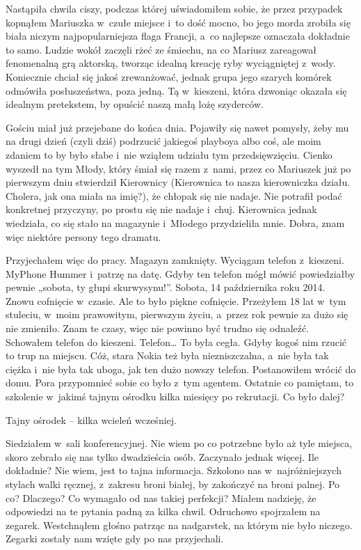 Nastąpiła chwila ciszy, podczas której uświadomiłem sobie, że przez przypadek kopnąłem Mariuszka w~czułe miejsce i~to dość mocno, bo jego morda zrobiła się biała niczym najpopularniejsza flaga Francji, a~co najlepsze oznaczała dokładnie to samo. Ludzie wokół zaczęli rżeć ze śmiechu, na co Mariusz zareagował fenomenalną grą aktorską, tworząc idealną kreację ryby wyciągniętej z~wody. Koniecznie chciał się jakoś zrewanżować, jednak grupa jego szarych komórek odmówiła posłuszeństwa, poza jedną. Tą w~kieszeni, która dzwoniąc okazała się idealnym pretekstem, by opuścić naszą małą lożę szyderców. 

Gościu miał już przejebane do końca dnia. Pojawiły się nawet pomysły, żeby mu na drugi dzień (czyli dziś) podrzucić jakiegoś playboya albo coś, ale moim zdaniem to by było słabe i~nie wziąłem udziału tym przedsięwzięciu. Cienko wyszedł na tym Młody, który śmiał się razem z~nami, przez co Mariuszek już po pierwszym dniu stwierdził Kierownicy (Kierownica to nasza kierowniczka działu. Cholera, jak ona miała na imię?), że chłopak się nie nadaje. Nie potrafił podać konkretnej przyczyny, po prostu się nie nadaje i~chuj. Kierownica jednak wiedziała, co się stało na magazynie i~Młodego przydzieliła mnie. Dobra, znam więc niektóre persony tego dramatu.

Przyjechałem więc do pracy. Magazyn zamknięty. Wyciągam telefon z~kieszeni. MyPhone Hummer i~patrzę na datę. Gdyby ten telefon mógł mówić powiedziałby pewnie „sobota, ty głupi skurwysynu!”. Sobota, 14 października roku 2014. Znowu cofnięcie w~czasie. Ale to było piękne cofnięcie. Przeżyłem 18 lat w~tym stuleciu, w~moim prawowitym, pierwszym życiu, a~przez rok pewnie za dużo się nie zmieniło. Znam te czasy, więc nie powinno być trudno się odnaleźć. Schowałem telefon do kieszeni. Telefon… To była cegła. Gdyby kogoś nim rzucić to trup na miejscu. Cóż, stara Nokia też była niezniszczalna, a~nie była tak ciężka i~nie była tak uboga, jak ten dużo nowszy telefon. Postanowiłem wrócić do domu. Pora przypomnieć sobie co było z~tym agentem. Ostatnie co pamiętam, to szkolenie w~jakimś tajnym ośrodku kilka miesięcy po rekrutacji. Co było dalej?

Tajny ośrodek -- kilka wcieleń wcześniej.

Siedziałem w~sali konferencyjnej. Nie wiem po co potrzebne było aż tyle miejsca, skoro zebrało się nas tylko dwadzieścia osób. Zaczynało jednak więcej. Ile dokładnie? Nie wiem, jest to tajna informacja. Szkolono nas w~najróżniejszych stylach walki ręcznej, z~zakresu broni białej, by zakończyć na broni palnej. Po co? Dlaczego? Co wymagało od nas takiej perfekcji? Miałem nadzieję, że odpowiedzi na te pytania padną za kilka chwil. Odruchowo spojrzałem na zegarek. Westchnąłem głośno patrząc na nadgarstek, na którym nie było niczego. Zegarki zostały nam wzięte gdy po nas przyjechali.

